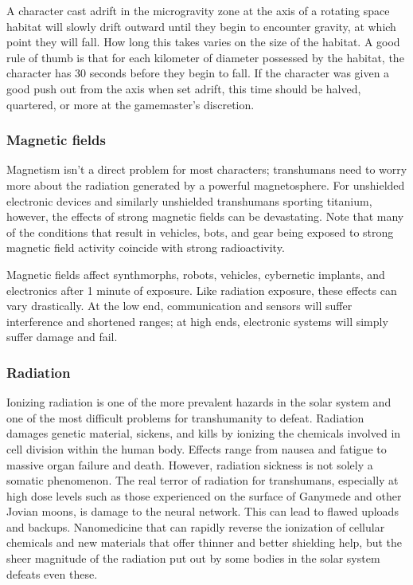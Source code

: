 A character cast adrift in the microgravity zone at the axis of a rotating space habitat will slowly drift outward until they begin to encounter gravity, at which point they will fall. How long this takes varies on the size of the habitat. A good rule of thumb is that for each kilometer of diameter possessed by the habitat, the character has 30 seconds before they begin to fall. If the character was given a good push out from the axis when set adrift, this time should be halved, quartered, or more at the gamemaster’s discretion.

\subsubsection{Magnetic fields}

Magnetism isn’t a direct problem for most characters; transhumans need to worry more about the radiation generated by a powerful magnetosphere. For unshielded electronic devices and similarly unshielded transhumans sporting titanium, however, the effects of strong magnetic fields can be devastating. Note that many of the conditions that result in vehicles, bots, and gear being exposed to strong magnetic field activity coincide with strong radioactivity.

Magnetic fields affect synthmorphs, robots, vehicles, cybernetic implants, and electronics after 1 minute of exposure. Like radiation exposure, these effects can vary drastically. At the low end, communication and sensors will suffer interference and shortened ranges; at high ends, electronic systems will simply suffer damage and fail.

\subsubsection{Radiation}

Ionizing radiation is one of the more prevalent hazards in the solar system and one of the most difficult problems for transhumanity to defeat. Radiation damages genetic material, sickens, and kills by ionizing the chemicals involved in cell division within the human body. Effects range from nausea and fatigue to massive organ failure and death. However, radiation sickness is not solely a somatic phenomenon. The real terror of radiation for transhumans, especially at high dose levels such as those experienced on the surface of Ganymede and other Jovian moons, is damage to the neural network. This can lead to flawed uploads and backups. Nanomedicine that can rapidly reverse the ionization of cellular chemicals and new materials that offer thinner and better shielding help, but the sheer magnitude of the radiation put out by some bodies in the solar system defeats even these.

